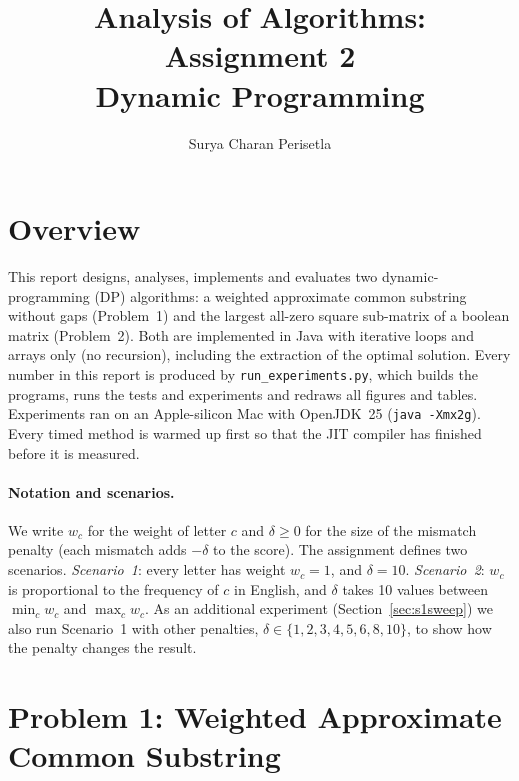 \documentclass[11pt]{article}
\title{Analysis of Algorithms: Assignment 2\\Dynamic Programming}
\author{Surya Charan Perisetla}
\date{}
\begin{document}
\maketitle

\section*{Overview}
This report designs, analyses, implements and evaluates two dynamic-programming
(DP) algorithms: a weighted approximate common substring without gaps
(Problem~1) and the largest all-zero square sub-matrix of a boolean matrix
(Problem~2). Both are implemented in Java with iterative loops and arrays only
(no recursion), including the extraction of the optimal solution. Every
number in this report is produced by \texttt{run\_experiments.py}, which
builds the programs, runs the tests and experiments and redraws all figures and
tables. Experiments ran on an Apple-silicon Mac with OpenJDK~25
(\texttt{java -Xmx2g}). Every timed method is warmed up first so that the
JIT compiler has finished before it is measured.

\paragraph{Notation and scenarios.} We write $w_c$ for the weight of letter
$c$ and $\delta \ge 0$ for the size of the mismatch penalty (each mismatch
adds $-\delta$ to the score). The assignment defines two scenarios.
\emph{Scenario~1}: every letter has weight $w_c=1$, and $\delta=10$.
\emph{Scenario~2}: $w_c$ is proportional to the
frequency of $c$ in English, and $\delta$ takes 10 values between
$\min_c w_c$ and $\max_c w_c$. As an additional experiment
(Section~\ref{sec:s1sweep}) we also run Scenario~1 with other penalties,
$\delta\in\{1,2,3,4,5,6,8,10\}$, to show how the penalty changes the result.

\section{Problem 1: Weighted Approximate Common Substring}
\end{document}
